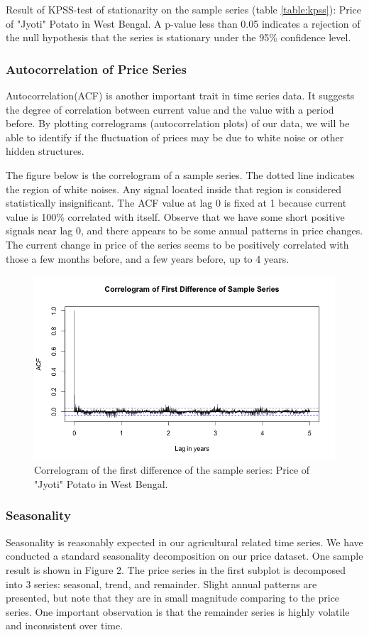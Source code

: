 Result of KPSS-test of stationarity on the sample series (table \ref{table:kpss}): Price of "Jyoti" Potato in West Bengal. A p-value less than 0.05 indicates a rejection of the null hypothesis that the series is stationary under the 95\% confidence level.

\subsubsection*{Autocorrelation of Price Series}
Autocorrelation(ACF) is another important trait in time series data. It suggests the degree of correlation between current value and the value with a period before. By plotting correlograms (autocorrelation plots) of our data, we will be able to identify if the fluctuation of prices may be due to white noise or other hidden structures.

The figure below is the correlogram of a sample series. The dotted line indicates the region of white noises. Any signal located inside that region is considered statistically insignificant. The ACF value at lag 0 is fixed at 1 because current value is 100\% correlated with itself. Observe that we have some short positive signals near lag 0, and there appears to be some annual patterns in price changes. The current change in price of the series seems to be positively correlated with those a few months before, and a few years before, up to 4 years.

\begin{figure}
    \centering
    \includegraphics[width=.7\textwidth]{./img/correlogram.png}
    \caption{Correlogram of the first difference of the sample series: Price of "Jyoti" Potato in West Bengal.}
\end{figure}

\subsubsection*{Seasonality}
Seasonality is reasonably expected in our agricultural related time series. We have conducted a standard seasonality decomposition on our price dataset. One sample result is shown in Figure 2. The price series in the first subplot is decomposed into 3 series: seasonal, trend, and remainder. Slight annual patterns are presented, but note that they are in small magnitude comparing to the price series. One important observation is that the remainder series is highly volatile and inconsistent over time.

